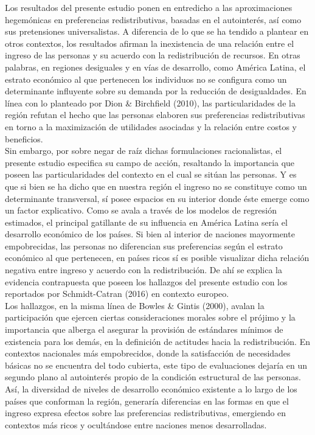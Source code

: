 \documentclass[12pt,letterpaper]{article}
\begin{document}
Los resultados del presente estudio ponen en entredicho a las aproximaciones hegemónicas en preferencias redistributivas, basadas en el autointerés, así como sus pretensiones universalistas. A diferencia de lo que se ha tendido a plantear en otros contextos, los resultados afirman la inexistencia de una relación entre el ingreso de las personas y su acuerdo con la redistribución de recursos. En otras palabras, en regiones desiguales y en vías de desarrollo, como América Latina, el estrato económico al que pertenecen los individuos no se configura como un determinante influyente sobre su demanda por la reducción de desigualdades. En línea con lo planteado por Dion \& Birchfield (2010), las particularidades de la región refutan el hecho que las personas elaboren sus preferencias redistributivas en torno a la maximización de utilidades asociadas y la relación entre costos y beneficios.\\

Sin embargo, por sobre negar de raíz dichas formulaciones racionalistas, el presente estudio especifica su campo de acción, resaltando la importancia que poseen las particularidades del contexto en el cual se sitúan las personas. Y es que si bien se ha dicho que en nuestra región el ingreso no se constituye como un determinante transversal, sí posee espacios en su interior donde éste emerge como un factor explicativo. Como se avala a través de los modelos de regresión estimados, el principal gatillante de su influencia en América Latina sería el desarrollo económico de los países. Si bien al interior de naciones mayormente empobrecidas, las personas no diferencian sus preferencias según el estrato económico al que pertenecen, en países ricos sí es posible visualizar dicha relación negativa entre ingreso y acuerdo con la redistribución. De ahí se explica la evidencia contrapuesta que poseen los hallazgos del presente estudio con los reportados por Schmidt-Catran (2016) en contexto europeo.\\

Los hallazgos, en la misma línea de Bowles \& Gintis (2000), avalan la participación que ejercen ciertas consideraciones morales sobre el prójimo y la importancia que alberga el asegurar la provisión de estándares mínimos de existencia para los demás, en la definición de actitudes hacia la redistribución. En contextos nacionales más empobrecidos, donde la satisfacción de necesidades básicas no se encuentra del todo cubierta, este tipo de evaluaciones dejaría en un segundo plano al autointerés propio de la condición estructural de las personas. Así, la diversidad de niveles de desarrollo económico existente a lo largo de los países que conforman la región, generaría diferencias en las formas en que el ingreso expresa efectos sobre las preferencias redistributivas, emergiendo en contextos más ricos y ocultándose entre naciones menos desarrolladas. \\
\end{document}
